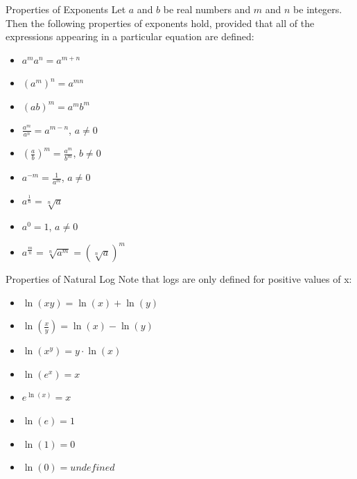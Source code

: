 \documentclass[aspectratio=169]{beamer}
\begin{document}
\begin{frame}{Properties of Exponents}\label{main1}
\hypertarget{exponentslide}{}
Let $a$ and $b$ be real numbers and $m$ and $n$ be integers. Then the following properties of exponents hold, provided that all of the expressions appearing in a particular equation are defined:
\begin{itemize}
\begin{itemize}
    \item $a^m a^n = a^{m+n}$
    \item $(a^m)^n = a^{mn}$
    \item $(ab)^m = a^m b^m$
    \item $\frac{a^m}{a^n} = a^{m-n}$, $a \neq 0$
    \item $\left(\frac{a}{b}\right)^m = \frac{a^m}{b^m}$, $b \neq 0$
    \item $a^{-m} = \frac{1}{a^m}$, $a \neq 0$
    \item $a^{\frac{1}{n}} = \sqrt[n]{a}$
    \item $a^0 = 1$, $a \neq 0$
    \item $a^{\frac{m}{n}} = \sqrt[n]{a^m} = \left(\sqrt[n]{a}\right)^m$
\end{itemize}
\end{itemize}
\end{frame}

\begin{frame}{Properties of Natural Log}\label{main1}
\hypertarget{naturallogslide}{}
Note that logs are only defined for positive values of x:
\begin{itemize}
\begin{itemize}
    \item $\ln(xy) = \ln(x) + \ln(y)$
    \item $\ln\left(\frac{x}{y}\right) = \ln(x) - \ln(y)$
    \item $\ln(x^y) = y \cdot \ln(x)$
    \item $\ln(e^x) = x$
    \item $e^{\ln(x)} = x$
    \item $\ln(e) = 1$
    \item $\ln(1) = 0$
    \item $\ln(0) = undefined$
\end{itemize}
\end{itemize}
\end{frame}
\end{document}

